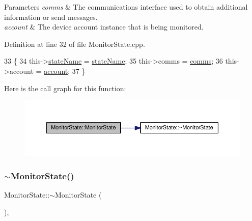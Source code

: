 \begin{DoxyParams}{Parameters}
{\em comms} & The communications interface used to obtain additional information or send messages. \\
\hline
{\em account} & The device account instance that is being monitored. \\
\hline
\end{DoxyParams}


Definition at line 32 of file Monitor\+State.\+cpp.


\begin{DoxyCode}
33 \{
34     this->\hyperlink{class_monitor_state_aaeef0ae307bb9cfcbb4fcb08c115fb0f}{stateName} = \hyperlink{class_monitor_state_aaeef0ae307bb9cfcbb4fcb08c115fb0f}{stateName};
35     this->comms = \hyperlink{class_monitor_state_a41914e9963c67ef2d17774f04bad3518}{comms};
36     this->account = \hyperlink{class_monitor_state_a41128d4942ec0d5b107c63d1d95af811}{account};
37 \}
\end{DoxyCode}
Here is the call graph for this function\+:\nopagebreak
\begin{figure}[H]
\begin{center}
\leavevmode
\includegraphics[width=350pt]{dd/d45/class_monitor_state_ace027ab9e5703ac4e4b808eeebc3c961_cgraph}
\end{center}
\end{figure}
\mbox{\label{class_monitor_state_a8dc9d7a46aa3d0190ec65b0d56167d3e}} 
\subsubsection{\texorpdfstring{$\sim$\+Monitor\+State()}{~MonitorState()}}
{\footnotesize\ttfamily Monitor\+State\+::$\sim$\+Monitor\+State (\begin{DoxyParamCaption}{ }\end{DoxyParamCaption})\hspace{0.3cm}{\ttfamily [virtual]}, {\ttfamily [default]}}

